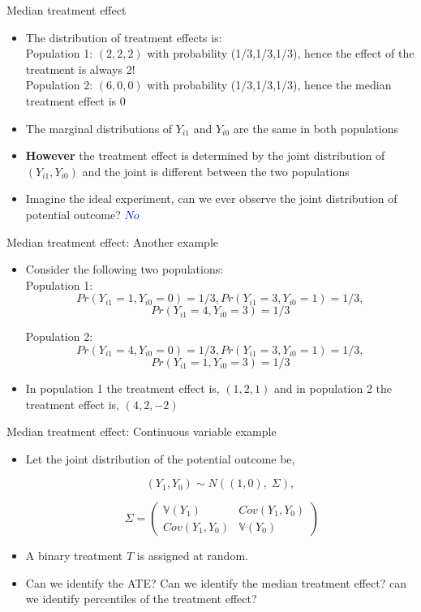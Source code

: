 \documentclass[handout]{beamer}
\theoremstyle{definition}
\begin{document}
\begin{frame}{Median treatment effect}
\begin{itemize}
\item The distribution of treatment effects is: \\
Population 1: $(2,2,2)$ with probability (1/3,1/3,1/3), hence the effect of the treatment is always 2!\\
Population 2: $(6,0,0)$ with probability (1/3,1/3,1/3), hence the median treatment effect is $0$
\item The marginal distributions of $Y_{i1}$ and $Y_{i0}$ are the same in both populations
\pause
\item \textbf{However} the treatment effect is determined by the joint distribution of $(Y_{i1},Y_{i0})$ and the joint is different between the two populations
\pause
\item Imagine the ideal experiment, can we ever observe the joint distribution of potential outcome? \pause \textcolor{blue}{$No$}
\end{itemize}
\end{frame}

\begin{frame}{Median treatment effect: Another example}
\begin{itemize}
\item Consider the following two populations:  \\
Population 1:
$$Pr(Y_{i1}=1,Y_{i0}=0)=1/3,Pr(Y_{i1}=3,Y_{i0}=1)=1/3,$$
$$Pr(Y_{i1}=4,Y_{i0}=3)=1/3 $$

Population 2:
$$Pr(Y_{i1}=4,Y_{i0}=0)=1/3,Pr(Y_{i1}=3,Y_{i0}=1)=1/3,$$
$$Pr(Y_{i1}=1,Y_{i0}=3)=1/3 $$

\item In population 1 the treatment effect is, $\left( 1,2,1 \right)$ and in population 2 the treatment effect is, $\left( 4,2,-2 \right)$
\end{itemize}
\end{frame}

\begin{frame}{Median treatment effect: Continuous variable example}
\begin{itemize}
\item Let the joint distribution of the potential outcome be,

\[ (Y_1,Y_0) \sim N((1,0),\;\Sigma),  \] 

\[  \;
\Sigma = \left( \begin{array}{cc}
 \mathbb{V}(Y_1) & Cov(Y_1,Y_0) \\
 Cov(Y_1,Y_0) & \mathbb{V}(Y_0)
\end{array} \right) \]

\item A binary treatment $T$ is assigned at random. 
\item Can we identify the ATE? Can we identify the median treatment effect? can we identify percentiles of the treatment effect?
\end{itemize}
\end{frame}
\end{document}
